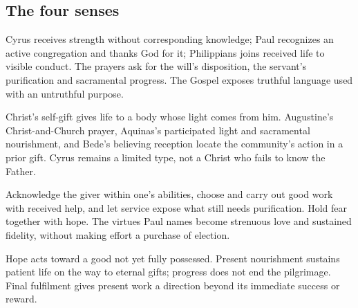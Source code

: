 \subsection{The four senses}
\begin{fourSenses}
\item[Literal.] Cyrus receives strength without corresponding knowledge; Paul recognizes an active congregation and thanks God for it; Philippians joins received life to visible conduct. The prayers ask for the will's disposition, the servant's purification and sacramental progress. The Gospel exposes truthful language used with an untruthful purpose.
\item[Allegorical.] Christ's self-gift gives life to a body whose light comes from him. Augustine's Christ-and-Church prayer, Aquinas's participated light and sacramental nourishment, and Bede's believing reception locate the community's action in a prior gift. Cyrus remains a limited type, not a Christ who fails to know the Father.
\item[Moral.] Acknowledge the giver within one's abilities, choose and carry out good work with received help, and let service expose what still needs purification. Hold fear together with hope. The virtues Paul names become strenuous love and sustained fidelity, without making effort a purchase of election.
\item[Anagogical.] Hope acts toward a good not yet fully possessed. Present nourishment sustains patient life on the way to eternal gifts; progress does not end the pilgrimage. Final fulfilment gives present work a direction beyond its immediate success or reward.
\end{fourSenses}
